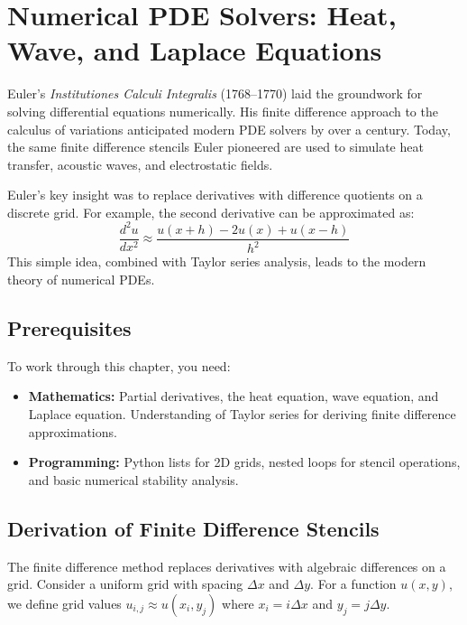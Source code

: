 
\chapter{Numerical PDE Solvers: Heat, Wave, and Laplace Equations}

\begin{historical}
Euler's \emph{Institutiones Calculi Integralis} (1768--1770) laid the groundwork for solving
differential equations numerically. His finite difference approach to the calculus of variations
anticipated modern PDE solvers by over a century. Today, the same finite difference stencils
Euler pioneered are used to simulate heat transfer, acoustic waves, and electrostatic fields.

Euler's key insight was to replace derivatives with difference quotients on a discrete grid.
For example, the second derivative can be approximated as:
\[
\frac{d^2u}{dx^2} \approx \frac{u(x+h) - 2u(x) + u(x-h)}{h^2}
\]
This simple idea, combined with Taylor series analysis, leads to the modern theory of
numerical PDEs. \cite{euler1768}\end{historical}

\section{Prerequisites}

To work through this chapter, you need:
\begin{itemize}
    \item \textbf{Mathematics:} Partial derivatives, the heat equation, wave equation, and Laplace equation.
    Understanding of Taylor series for deriving finite difference approximations.
    \item \textbf{Programming:} Python lists for 2D grids, nested loops for stencil operations,
    and basic numerical stability analysis.
\end{itemize}

\section{Derivation of Finite Difference Stencils}

The finite difference method replaces derivatives with algebraic differences on a grid.
Consider a uniform grid with spacing $\Delta x$ and $\Delta y$. For a function $u(x,y)$,
we define grid values $u_{i,j} \approx u(x_i, y_j)$ where $x_i = i\Delta x$ and $y_j = j\Delta y$.

